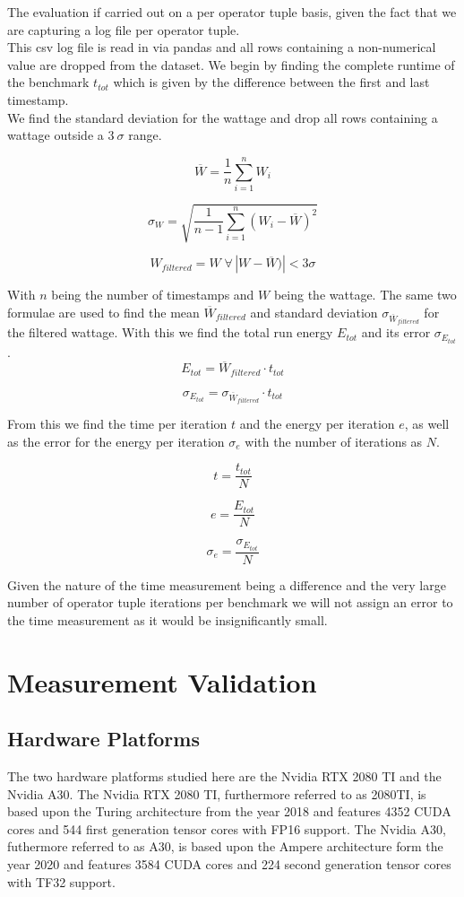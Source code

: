 \documentclass[conference]{IEEEtran}
\begin{document}
The evaluation if carried out on a per operator tuple basis, given the fact that we are capturing a log file per operator tuple. \\
This csv log file is read in via pandas and all rows containing a non-numerical value are dropped from the dataset. We begin by finding the complete runtime of the benchmark $t_{tot}$ which is given by the difference between the first and last timestamp. \\
We find the standard deviation for the wattage and drop all rows containing a wattage outside a $3 \: \sigma $ range.

\[
\overline{W} = \frac{1}{n} \sum_{i=1}^{n} W_i
\]

\[
\sigma_W = \sqrt{\frac{1}{n - 1} \sum_{i=1}^{n} (W_i - \overline{W})^2}
\]


\[
W_{filtered} = W \; \forall \, |W - \overline{W})| < 3 \sigma
\]

With $n$ being the number of timestamps and $W$ being the wattage. The same two formulae are used to find the mean $ \overline{W}_{filtered}$ and standard deviation $\sigma_{\overline{W}_{filtered}}$ for the filtered wattage. With this we find the total run energy $ E_{tot}$ and its error $\sigma_{E_{tot}}$.
 \[
 E_{tot} = \overline{W}_{filtered} \cdot t_{tot}
 \]

  \[
 \sigma_{E_{tot}} = \sigma_{\overline{W}_{filtered}} \cdot t_{tot}
 \]

From this we find the time per iteration $t$ and the energy per iteration $e$, as well as the error for the energy per iteration $\sigma_e$ with the number of iterations as $N$.

\[
t = \frac{t_{tot}}{N}
\]


\[
e = \frac{E_{tot}}{N}
\]

\[
\sigma_e = \frac{\sigma_{E_{tot}}}{N}
\]

Given the nature of the time measurement being a difference and the very large number of operator tuple iterations per benchmark we will not assign an error to the time measurement as it would be insignificantly small.

\section{Measurement Validation}

\subsection{Hardware Platforms}
The two hardware platforms studied here are the Nvidia RTX 2080 TI and the Nvidia A30. The Nvidia RTX 2080 TI, furthermore referred to as 2080TI, is based upon the Turing architecture from the year 2018 and features 4352 CUDA cores and 544 first generation tensor cores with FP16 support. The Nvidia A30, futhermore referred to as A30, is based upon the Ampere architecture form the year 2020 and features 3584 CUDA cores and 224 second generation tensor cores with TF32 support.\\
\end{document}
